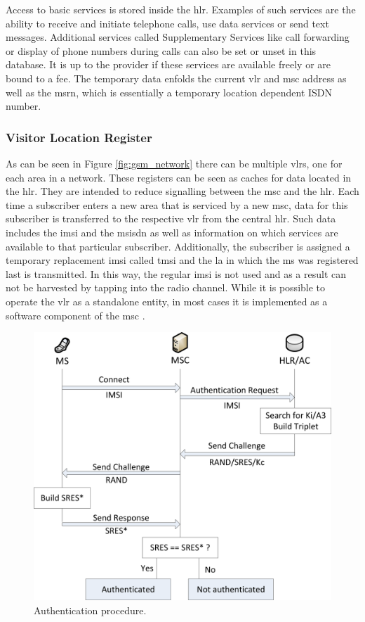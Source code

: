 Access to basic services is stored inside the \gls{hlr}.
Examples of such services are the ability to receive and initiate telephone calls, use data services or send text messages.
Additional services called Supplementary Services like call forwarding or display of phone numbers during calls can also be set or unset in this database.
It is up to the provider if these services are available freely or are bound to a fee.
The temporary data enfolds the current \gls{vlr} and \gls{msc} address as well as the \gls{msrn}, which is essentially a temporary location dependent ISDN number.

\subsubsection{Visitor Location Register}
As can be seen in Figure \ref{fig:gsm_network} there can be multiple \glspl{vlr}, one for each area in a network.
These registers can be seen as caches for data located in the \gls{hlr}.
They are intended to reduce signalling between the \gls{msc} and the \gls{hlr}.
Each time a subscriber enters a new area that is serviced by a new \gls{msc}, data for this subscriber is transferred to the respective \gls{vlr} from the central \gls{hlr}.
Such data includes the \gls{imsi} and the \gls{msisdn} as well as information on which services are available to that particular subscriber.
Additionally, the subscriber is assigned a temporary replacement \gls{imsi} called \gls{tmsi} and the \gls{la} in which the \gls{ms} was registered last is transmitted.
In this way, the regular \gls{imsi} is not used and as a result can not be harvested by tapping into the radio channel.
While it is possible to operate the \gls{vlr} as a standalone entity, in most cases it is implemented as a software component of the \gls{msc} \cite{kommsys2006}.

\begin{figure}
\centering
\includegraphics{../Images/Authentication}
\caption{Authentication procedure.}
\label{fig:authentication}
\end{figure}

